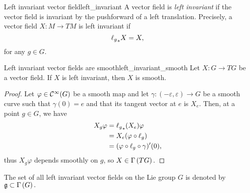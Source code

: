 \begin{definition}{Left invariant vector field}{left_invariant}
    A vector field is \emph{left invariant} if the vector field is invariant by the pushforward of a left translation. Precisely, a vector field \(X : M \to TM\) is left invariant if
    \begin{equation*}
        {\ell_g}_{\ast{}}X = X,
    \end{equation*}
    for any \(g \in G.\)
\end{definition}

\begin{lemma}{Left invariant vector fields are smooth}{left_invariant_smooth}
    Let \(X : G \to TG\) be a vector field. If \(X\) is left invariant, then \(X\) is smooth.
\end{lemma}
\begin{proof}
    Let \(\varphi \in \mathcal{C}^\infty(G)\) be a smooth map and let \(\gamma : (-\varepsilon, \varepsilon) \to G\) be a smooth curve such that \(\gamma(0) = e\) and that its tangent vector at \(e\) is \(X_e.\) Then, at a point \(g \in G\), we have
    \begin{align*}
        X_g\varphi &= {\ell_g}_{\ast{}}(X_e)\varphi\\
             &= X_e(\varphi \circ \ell_g)\\
             &= (\varphi \circ \ell_g \circ \gamma)'(0),
    \end{align*}
    thus \(X_g\varphi\) depends smoothly on \(g\), so \(X \in \Gamma\left(TG\right).\)
\end{proof}
The set of all left invariant vector fields on the Lie group \(G\) is denoted by \(\mathfrak{g} \subset \Gamma\left(G\right).\)

